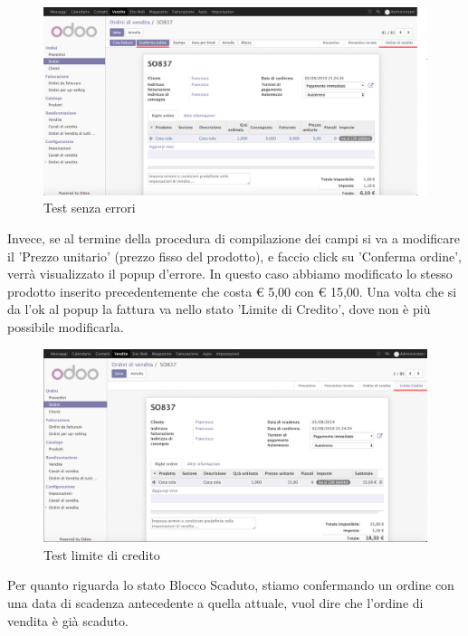 \begin{figure}[H]
	\begin{center} \includegraphics[scale=0.3]{figures/first_test}
		\caption[Test senza errori]{Test senza errori}
		\label{fig:first_test}
	\end{center}
\end{figure}

Invece, se al termine della procedura di compilazione dei campi si va a modificare il 'Prezzo unitario' (prezzo fisso del prodotto), e faccio click su 'Conferma ordine', verrà visualizzato il popup d'errore.
In questo caso abbiamo modificato lo stesso prodotto inserito precedentemente che costa € 5,00 con € 15,00. 
Una volta che si da l'ok al popup la fattura va nello stato 'Limite di Credito', dove non è più possibile modificarla.


\begin{figure}[H]
	\begin{center} \includegraphics[scale=0.3]{figures/second_test}
		\caption[Test limite di credito]{Test limite di credito}
		\label{fig:second_test}
	\end{center}
\end{figure}

Per quanto riguarda lo stato Blocco Scaduto, stiamo confermando un ordine con una data di scadenza antecedente a quella attuale, vuol dire che l'ordine di vendita è già scaduto.

